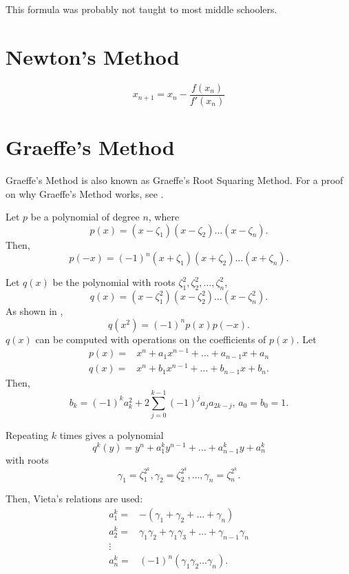 \documentclass{article}
\begin{document}
This formula was probably not taught to most middle schoolers.




\section{Newton's Method}

\begin{equation}
	x_{n+1}=x_n-\frac{f(x_n)}{f'(x_n)}
\end{equation}

\section{Graeffe's Method}

Graeffe's Method is also known as Graeffe's Root Squaring Method.
For a proof on why Graeffe's Method works, see \cite{graeffe:proof}.

Let $p$ be a polynomial of degree $n$, where 
\[p(x)=(x-\zeta_1)(x-\zeta_2)\dots(x-\zeta_n).\]
Then,
\[p(-x)=(-1)^n(x+\zeta_1)(x+\zeta_2)\dots(x+\zeta_n).\]

Let $q(x)$ be the polynomial with roots $\zeta_1^2,\zeta_2^2,\dots,\zeta_n^2$,
\[q(x)=(x-\zeta_1^2)(x-\zeta_2^2)\dots(x-\zeta_n^2).\]
As shown in \cite{wiki:graeffe}, 
\[q(x^2)=(-1)^np(x)p(-x).\]
$q(x)$ can be computed with operations on the coefficients of $p(x)$.
Let
\begin{align*}
	p(x) =& x^n+a_1x^{n-1}+\dots+a_{n-1}x+a_n \\
	q(x) =& x^n+b_1x^{n-1}+\dots+b_{n-1}x+b_n. 
\end{align*}
Then,
\[b_k=(-1)^ka_k^2+2\sum_{j=0}^{k-1}(-1)^ja_ja_{2k-j},\,a_0=b_0=1.\]

Repeating $k$ times gives a polynomial
\[q^k(y)=y^n+a_1^ky^{n-1}+\dots+a_{n-1}^ky+a_n^k\]
with roots
\[\gamma_1=\zeta_1^{2^k},\gamma_2=\zeta_2^{2^k},\dots,\gamma_n=\zeta_n^{2^k}.\]

Then, Vieta's relations\cite{wiki:vieta} are used: 
\begin{align*}
	a_1^k =& -(\gamma_1+\gamma_2+\dots+\gamma_n) \\
	a_2^k =& \gamma_1\gamma_2+\gamma_1\gamma_3+\dots+\gamma_{n-1}\gamma_n \\
	\vdots & \\
	a_n^k =& (-1)^n(\gamma_1\gamma_2\dots\gamma_n).
\end{align*}
\end{document}
